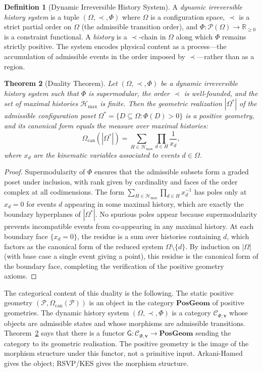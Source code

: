 \documentclass[12pt, oneside]{amsart}
\theoremstyle{plain}
\newtheorem{theorem}{Theorem}[section]
\theoremstyle{definition}
\newtheorem{definition}[theorem]{Definition}
\theoremstyle{remark}
\newcommand{\R}{\mathbb{R}}
\newcommand{\Phif}{\Phi}
\newcommand{\OmKS}{\Omega}
\newcommand{\CF}{\Omega_{\mathrm{can}}}
\newcommand{\PG}{\mathbf{PosGeom}}
\newcommand{\Ccat}{\mathcal{C}_{\Phi,\mathbf{v}}}
\newcommand{\Gfun}{\mathsf{G}}
\newcommand{\Hmax}{\mathcal{H}_{\max}}
\begin{document}
\begin{definition}[Dynamic Irreversible History System]
A \emph{dynamic irreversible history system} is a tuple $(\OmKS, \prec, \Phif)$ where $\OmKS$ is a configuration space, $\prec$ is a strict partial order on $\OmKS$ (the admissible transition order), and $\Phif: \mathcal{P}(\OmKS) \to \R_{\geq 0}$ is a constraint functional. A \emph{history} is a $\prec$-chain in $\OmKS$ along which $\Phif$ remains strictly positive. The system encodes physical content as a process---the accumulation of admissible events in the order imposed by $\prec$---rather than as a region.
\end{definition}

\begin{theorem}[Duality Theorem]
\label{thm:duality}
Let $(\OmKS, \prec, \Phif)$ be a dynamic irreversible history system such that $\Phif$ is supermodular, the order $\prec$ is well-founded, and the set of maximal histories $\Hmax$ is finite. Then the geometric realization $|\OmKS^*|$ of the admissible configuration poset $\OmKS^* = \{D \subseteq \OmKS : \Phif(D) > 0\}$ is a positive geometry, and its canonical form equals the measure over maximal histories:
\[
  \CF(|\OmKS^*|) = \sum_{H \in \Hmax} \prod_{d \in H} \frac{1}{x_d},
\]
where $x_d$ are the kinematic variables associated to events $d \in \OmKS$.
\end{theorem}

\begin{proof}
Supermodularity of $\Phif$ ensures that the admissible subsets form a graded poset under inclusion, with rank given by cardinality and faces of the order complex at all codimensions. The form $\sum_{H \in \Hmax} \prod_{d \in H} x_d^{-1}$ has poles only at $x_d = 0$ for events $d$ appearing in some maximal history, which are exactly the boundary hyperplanes of $|\OmKS^*|$. No spurious poles appear because supermodularity prevents incompatible events from co-appearing in any maximal history. At each boundary face $\{x_d = 0\}$, the residue is a sum over histories containing $d$, which factors as the canonical form of the reduced system $\OmKS \setminus \{d\}$. By induction on $|\OmKS|$ (with base case a single event giving a point), this residue is the canonical form of the boundary face, completing the verification of the positive geometry axioms.
\end{proof}

The categorical content of this duality is the following. The static positive geometry $(\mathcal{P}, \CF(\mathcal{P}))$ is an object in the category $\PG$ of positive geometries. The dynamic history system $(\OmKS, \prec, \Phif)$ is a category $\Ccat$ whose objects are admissible states and whose morphisms are admissible transitions. Theorem~\ref{thm:duality} says that there is a functor $\Gfun: \Ccat \to \PG$ sending the category to its geometric realisation. The positive geometry is the image of the morphism structure under this functor, not a primitive input. Arkani-Hamed gives the object; RSVP/KES gives the morphism structure.
\end{document}
